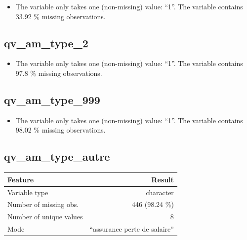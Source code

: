\documentclass[
  letterpaper,
  DIV=11,
  numbers=noendperiod]{scrartcl}
\providecommand{\tightlist}{%
  \setlength{\itemsep}{0pt}\setlength{\parskip}{0pt}}
\begin{document}
\begin{itemize}
\tightlist
\item
  The variable only takes one (non-missing) value: ``1''. The variable
  contains 33.92 \% missing observations.
\end{itemize}

\fullline

\subsection{qv\_am\_type\_2}\label{qv_am_type_2}

\begin{itemize}
\tightlist
\item
  The variable only takes one (non-missing) value: ``1''. The variable
  contains 97.8 \% missing observations.
\end{itemize}

\fullline

\subsection{qv\_am\_type\_999}\label{qv_am_type_999}

\begin{itemize}
\tightlist
\item
  The variable only takes one (non-missing) value: ``1''. The variable
  contains 98.02 \% missing observations.
\end{itemize}

\fullline

\subsection{qv\_am\_type\_autre}\label{qv_am_type_autre}

\bminione

\begin{longtable}[]{@{}lr@{}}
\toprule\noalign{}
Feature & Result \\
\midrule\noalign{}
\endhead
\bottomrule\noalign{}
\endlastfoot
Variable type & character \\
Number of missing obs. & 446 (98.24 \%) \\
Number of unique values & 8 \\
Mode & ``assurance perte de salaire'' \\
\end{longtable}

\emini
\bminitwo
\end{document}
